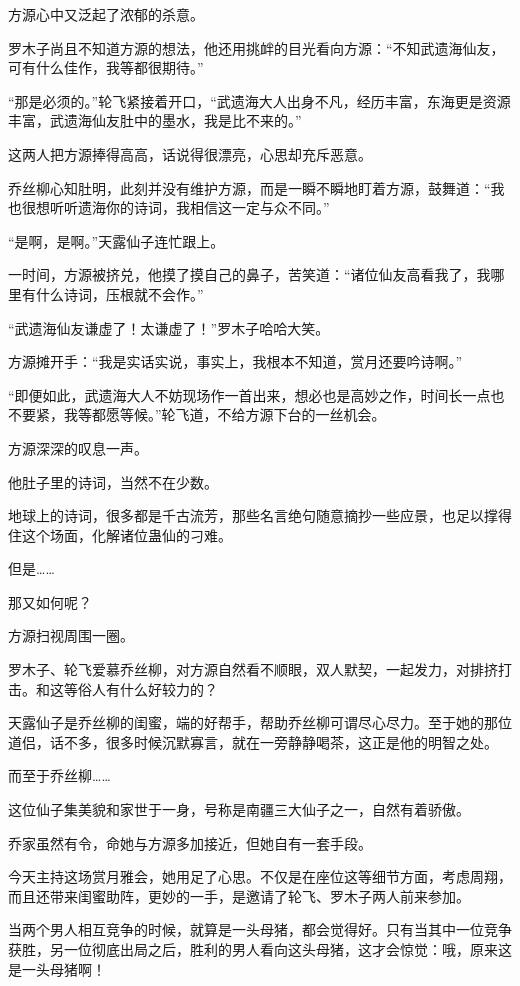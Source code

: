 \begin{this_body}
方源心中又泛起了浓郁的杀意。

罗木子尚且不知道方源的想法，他还用挑衅的目光看向方源：“不知武遗海仙友，可有什么佳作，我等都很期待。”

“那是必须的。”轮飞紧接着开口，“武遗海大人出身不凡，经历丰富，东海更是资源丰富，武遗海仙友肚中的墨水，我是比不来的。”

这两人把方源捧得高高，话说得很漂亮，心思却充斥恶意。

乔丝柳心知肚明，此刻并没有维护方源，而是一瞬不瞬地盯着方源，鼓舞道：“我也很想听听遗海你的诗词，我相信这一定与众不同。”

“是啊，是啊。”天露仙子连忙跟上。

一时间，方源被挤兑，他摸了摸自己的鼻子，苦笑道：“诸位仙友高看我了，我哪里有什么诗词，压根就不会作。”

“武遗海仙友谦虚了！太谦虚了！”罗木子哈哈大笑。

方源摊开手：“我是实话实说，事实上，我根本不知道，赏月还要吟诗啊。”

“即便如此，武遗海大人不妨现场作一首出来，想必也是高妙之作，时间长一点也不要紧，我等都愿等候。”轮飞道，不给方源下台的一丝机会。

方源深深的叹息一声。

他肚子里的诗词，当然不在少数。

地球上的诗词，很多都是千古流芳，那些名言绝句随意摘抄一些应景，也足以撑得住这个场面，化解诸位蛊仙的刁难。

但是……

那又如何呢？

方源扫视周围一圈。

罗木子、轮飞爱慕乔丝柳，对方源自然看不顺眼，双人默契，一起发力，对排挤打击。和这等俗人有什么好较力的？

天露仙子是乔丝柳的闺蜜，端的好帮手，帮助乔丝柳可谓尽心尽力。至于她的那位道侣，话不多，很多时候沉默寡言，就在一旁静静喝茶，这正是他的明智之处。

而至于乔丝柳……

这位仙子集美貌和家世于一身，号称是南疆三大仙子之一，自然有着骄傲。

乔家虽然有令，命她与方源多加接近，但她自有一套手段。

今天主持这场赏月雅会，她用足了心思。不仅是在座位这等细节方面，考虑周翔，而且还带来闺蜜助阵，更妙的一手，是邀请了轮飞、罗木子两人前来参加。

当两个男人相互竞争的时候，就算是一头母猪，都会觉得好。只有当其中一位竞争获胜，另一位彻底出局之后，胜利的男人看向这头母猪，这才会惊觉：哦，原来这是一头母猪啊！


\end{this_body}
